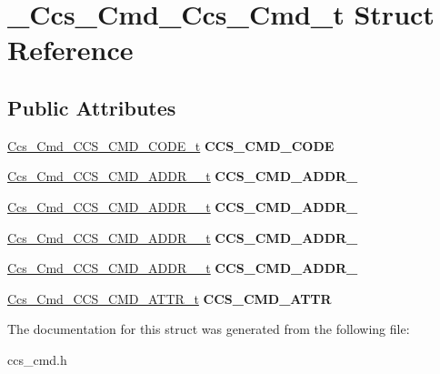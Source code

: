 \hypertarget{struct__Ccs__Cmd__Ccs__Cmd__t}{\section{\-\_\-\-Ccs\-\_\-\-Cmd\-\_\-\-Ccs\-\_\-\-Cmd\-\_\-t Struct Reference}
\label{struct__Ccs__Cmd__Ccs__Cmd__t}
}
\subsection*{Public Attributes}
\begin{DoxyCompactItemize}
\item 
\hypertarget{struct__Ccs__Cmd__Ccs__Cmd__t_ac41a61f298433ad4854c720208ca21bc}{\hyperlink{union__Ccs__Cmd__CCS__CMD__CODE__t}{Ccs\-\_\-\-Cmd\-\_\-\-C\-C\-S\-\_\-\-C\-M\-D\-\_\-\-C\-O\-D\-E\-\_\-t} {\bfseries C\-C\-S\-\_\-\-C\-M\-D\-\_\-\-C\-O\-D\-E}}\label{struct__Ccs__Cmd__Ccs__Cmd__t_ac41a61f298433ad4854c720208ca21bc}

\item 
\hypertarget{struct__Ccs__Cmd__Ccs__Cmd__t_a525a70ca7cb4cae92f45207feb854882}{\hyperlink{union__Ccs__Cmd__CCS__CMD__ADDR__1__t}{Ccs\-\_\-\-Cmd\-\_\-\-C\-C\-S\-\_\-\-C\-M\-D\-\_\-\-A\-D\-D\-R\-\_\-\_\-t} {\bfseries C\-C\-S\-\_\-\-C\-M\-D\-\_\-\-A\-D\-D\-R\-\_}}\label{struct__Ccs__Cmd__Ccs__Cmd__t_a525a70ca7cb4cae92f45207feb854882}

\item 
\hypertarget{struct__Ccs__Cmd__Ccs__Cmd__t_adfc50b1779b24822a43c5d87e7731e51}{\hyperlink{union__Ccs__Cmd__CCS__CMD__ADDR__2__t}{Ccs\-\_\-\-Cmd\-\_\-\-C\-C\-S\-\_\-\-C\-M\-D\-\_\-\-A\-D\-D\-R\-\_\-\_\-t} {\bfseries C\-C\-S\-\_\-\-C\-M\-D\-\_\-\-A\-D\-D\-R\-\_}}\label{struct__Ccs__Cmd__Ccs__Cmd__t_adfc50b1779b24822a43c5d87e7731e51}

\item 
\hypertarget{struct__Ccs__Cmd__Ccs__Cmd__t_a6149f7ee605eee429e3f275927b9529f}{\hyperlink{union__Ccs__Cmd__CCS__CMD__ADDR__3__t}{Ccs\-\_\-\-Cmd\-\_\-\-C\-C\-S\-\_\-\-C\-M\-D\-\_\-\-A\-D\-D\-R\-\_\-\_\-t} {\bfseries C\-C\-S\-\_\-\-C\-M\-D\-\_\-\-A\-D\-D\-R\-\_}}\label{struct__Ccs__Cmd__Ccs__Cmd__t_a6149f7ee605eee429e3f275927b9529f}

\item 
\hypertarget{struct__Ccs__Cmd__Ccs__Cmd__t_a0bd66b8e3c748f02e928093f986f5090}{\hyperlink{union__Ccs__Cmd__CCS__CMD__ADDR__4__t}{Ccs\-\_\-\-Cmd\-\_\-\-C\-C\-S\-\_\-\-C\-M\-D\-\_\-\-A\-D\-D\-R\-\_\-\_\-t} {\bfseries C\-C\-S\-\_\-\-C\-M\-D\-\_\-\-A\-D\-D\-R\-\_}}\label{struct__Ccs__Cmd__Ccs__Cmd__t_a0bd66b8e3c748f02e928093f986f5090}

\item 
\hypertarget{struct__Ccs__Cmd__Ccs__Cmd__t_abbd7a0c70368e0aa396dd8e1a51c7ff8}{\hyperlink{union__Ccs__Cmd__CCS__CMD__ATTR__t}{Ccs\-\_\-\-Cmd\-\_\-\-C\-C\-S\-\_\-\-C\-M\-D\-\_\-\-A\-T\-T\-R\-\_\-t} {\bfseries C\-C\-S\-\_\-\-C\-M\-D\-\_\-\-A\-T\-T\-R}}\label{struct__Ccs__Cmd__Ccs__Cmd__t_abbd7a0c70368e0aa396dd8e1a51c7ff8}

\end{DoxyCompactItemize}


The documentation for this struct was generated from the following file\-:\begin{DoxyCompactItemize}
\item 
ccs\-\_\-cmd.\-h\end{DoxyCompactItemize}
